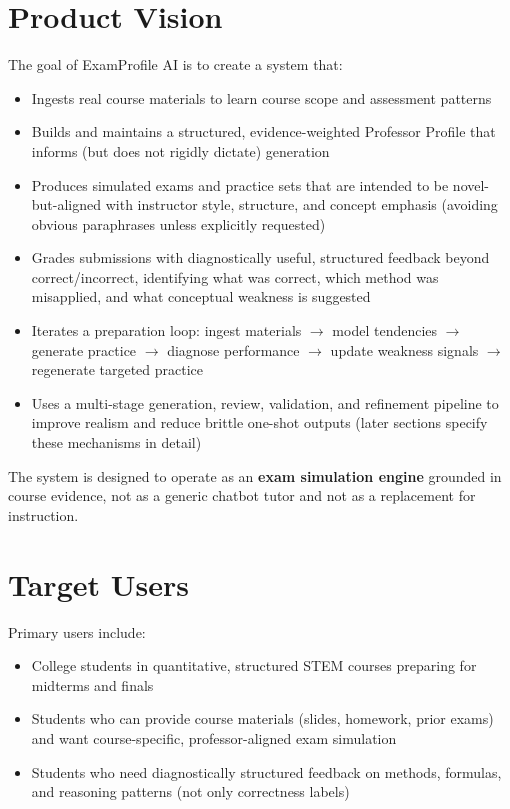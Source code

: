 \documentclass[11pt]{article}
\begin{document}
\section{Product Vision}
The goal of ExamProfile AI is to create a system that:
\begin{itemize}
\item Ingests real course materials to learn course scope and assessment patterns
\item Builds and maintains a structured, evidence-weighted Professor Profile that informs (but does not rigidly dictate) generation
\item Produces simulated exams and practice sets that are intended to be novel-but-aligned with instructor style, structure, and concept emphasis (avoiding obvious paraphrases unless explicitly requested)
\item Grades submissions with diagnostically useful, structured feedback beyond correct/incorrect, identifying what was correct, which method was misapplied, and what conceptual weakness is suggested
\item Iterates a preparation loop: ingest materials $\rightarrow$ model tendencies $\rightarrow$ generate practice $\rightarrow$ diagnose performance $\rightarrow$ update weakness signals $\rightarrow$ regenerate targeted practice
\item Uses a multi-stage generation, review, validation, and refinement pipeline to improve realism and reduce brittle one-shot outputs (later sections specify these mechanisms in detail)
\end{itemize}

The system is designed to operate as an \textbf{exam simulation engine} grounded in course evidence, not as a generic chatbot tutor and not as a replacement for instruction.

\section{Target Users}
Primary users include:
\begin{itemize}
\item College students in quantitative, structured STEM courses preparing for midterms and finals
\item Students who can provide course materials (slides, homework, prior exams) and want course-specific, professor-aligned exam simulation
\item Students who need diagnostically structured feedback on methods, formulas, and reasoning patterns (not only correctness labels)
\end{itemize}
\end{document}
